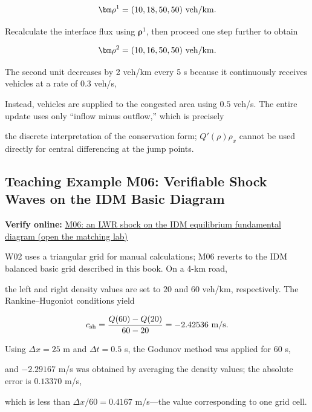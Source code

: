 \documentclass[11pt,a4paper,openany]{book}
\numberwithin{equation}{chapter}
\numberwithin{figure}{chapter}
\numberwithin{table}{chapter}
\newcommand{\onlinelab}[2]{%
  \par\smallskip\noindent
  {\small\sffamily\color{teal}\textbf{Verify online: }\href{https://cwan-ucr.github.io/traffic-stability-book/lab/?case=#1}{#2 (open the matching lab)}}%
  \par\smallskip}
\begin{document}
\[
\bm\rho^1=(10,18,50,50)\ {\rm veh/km}.
\]

Recalculate the interface flux using $\bm\rho^1$, then proceed one step further to obtain

\begin{equation}
\bm\rho^2=(10,16,50,50)\ {\rm veh/km}.
\label{eq:w02-second-update}
\end{equation}

The second unit decreases by 2 veh/km every 5 s because it continuously receives vehicles at a rate of $0.3$ veh/s,


Instead, vehicles are supplied to the congested area using $0.5$ veh/s. The entire update uses only “inflow minus outflow,” which is precisely

the discrete interpretation of the conservation form; $Q'(\rho)\rho_x$ cannot be used directly for central differencing at the jump points.










\subsection{Teaching Example M06: Verifiable Shock Waves on the IDM Basic Diagram}
\onlinelab{M06}{M06: an LWR shock on the IDM equilibrium fundamental diagram}







\label{sub:m06-lwr}




W02 uses a triangular grid for manual calculations; M06 reverts to the IDM balanced basic grid described in this book. On a 4-km road,

the left and right density values are set to $20$ and $60$ veh/km, respectively. The Rankine–Hugoniot conditions yield

\begin{equation}
c_{\rm sh}=\frac{Q(60)-Q(20)}{60-20}
=-2.42536\ {\rm m/s}.
\label{eq:m06-shock}
\end{equation}

Using $\Delta x=25$ m and $\Delta t=0.5$ s, the Godunov method was applied for 60 s,

and $-2.29167$ m/s was obtained by averaging the density values; the absolute error is $0.13370$ m/s,

which is less than $\Delta x/60=0.4167$ m/s—the value corresponding to one grid cell.
\end{document}
